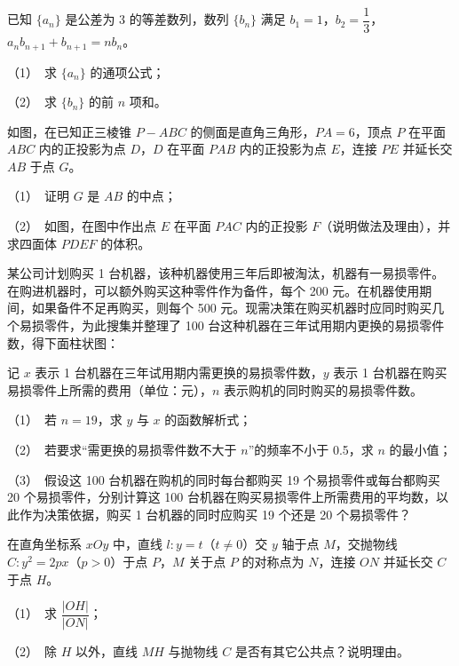 \begin{question}
已知 \(\{a_n\}\) 是公差为 3 的等差数列，数列 \(\{b_n\}\) 满足 \(b_1=1\)，\(b_2=\dfrac{1}{3}\)，\(a_nb_{n+1}+b_{n+1}=nb_n\)。

   （1）　求 \(\{a_n\}\) 的通项公式；

   （2）　求 \(\{b_n\}\) 的前 \(n\) 项和。

\Needspace{0.4\textheight}
\end{question}
\begin{question}
如图，在已知正三棱锥 \(P-ABC\) 的侧面是直角三角形，\(PA=6\)，顶点 \(P\) 在平面 \(ABC\) 内的正投影为点 \(D\)，\(D\) 在平面 \(PAB\) 内的正投影为点 \(E\)，连接 \(PE\) 并延长交 \(AB\) 于点 \(G\)。
\nopagebreak[4]
\begin{center}\end{center}
\nopagebreak[4]
   （1）　证明 \(G\) 是 \(AB\) 的中点；

   （2）　如图，在图中作出点 \(E\) 在平面 \(PAC\) 内的正投影 \(F\)（说明做法及理由），并求四面体 \(PDEF\) 的体积。

\Needspace{0.4\textheight}
\end{question}
\begin{question}
某公司计划购买 1 台机器，该种机器使用三年后即被淘汰，机器有一易损零件。在购进机器时，可以额外购买这种零件作为备件，每个 200 元。在机器使用期间，如果备件不足再购买，则每个 500 元。现需决策在购买机器时应同时购买几个易损零件，为此搜集并整理了 100 台这种机器在三年试用期内更换的易损零件数，得下面柱状图：
\nopagebreak[4]
\begin{center}\end{center}
\nopagebreak[4]
   记 \(x\) 表示 1 台机器在三年试用期内需更换的易损零件数，\(y\) 表示 1 台机器在购买易损零件上所需的费用（单位：元），\(n\) 表示购机的同时购买的易损零件数。

   （1）　若 \(n=19\)，求 \(y\) 与 \(x\) 的函数解析式；

   （2）　若要求“需更换的易损零件数不大于 \(n\)”的频率不小于 0.5，求 \(n\) 的最小值；

   （3）　假设这 100 台机器在购机的同时每台都购买 19 个易损零件或每台都购买 20 个易损零件，分别计算这 100 台机器在购买易损零件上所需费用的平均数，以此作为决策依据，购买 1 台机器的同时应购买 19 个还是 20 个易损零件？

\end{question}
\begin{question}
在直角坐标系 \(xOy\) 中，直线 \(l:y=t\)（\(t\ne 0\)）交 \(y\) 轴于点 \(M\)，交抛物线 \(C:y^2=2px\)（\(p>0\)）于点 \(P\)，\(M\) 关于点 \(P\) 的对称点为 \(N\)，连接 \(ON\) 并延长交 \(C\) 于点 \(H\)。

   （1）　求 \(\dfrac{|OH|}{|ON|}\)；

   （2）　除 \(H\) 以外，直线 \(MH\) 与抛物线 \(C\) 是否有其它公共点？说明理由。

\end{question}
